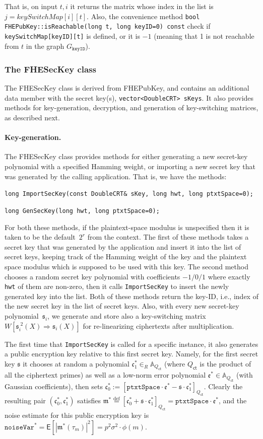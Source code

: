 \documentclass[14pt]{extarticle}
\newcommand{\A}{\mathbb{A}}
\def\Qct{Q_\mathsf{ct}}
\def\eqdef{\stackrel{\mathrm{def}}{=}}
\def\FHEPubKey{\textsf{FHEPubKey}}
\def\FHESecKey{\textsf{FHESecKey}}
\def\EXP{\mathsf{E}}
\newcommand{\ee}{\mathfrak{e}}
\newcommand{\ct}{\mathfrak{c}}
\newcommand{\mm}{\mathfrak{m}}
\newcommand{\sk}{\mathfrak{s}}
\begin{document}
\noindent
That is, on input $t,i$ it returns the matrix whose index in the
list is $j=keySwitchMap[i][t]$. Also, the convenience method
\texttt{bool FHEPubKey::isReachable(long t, long keyID=0) const}
check if \texttt{keySwitchMap[keyID][t]} is defined, or it is $-1$
(meaning that 1 is not reachable from $t$ in the graph
$G_{\mathtt{keyID}}$).

\subsubsection{The {\FHESecKey} class}\label{sec:FHESecKey}
The {\FHESecKey} class is derived from {\FHEPubKey}, and contains an
additional data member with the secret key(s), \texttt{vector<DoubleCRT>
sKeys}. It also provides methods for key-generation, decryption, and
generation of key-switching matrices, as described next.

\paragraph{Key-generation.}
The {\FHESecKey} class provides methods for either generating a
new secret-key polynomial with a specified Hamming weight, or
importing a new secret key that was generated by the calling
application. That is, we have the methods:

\texttt{long ImportSecKey(const DoubleCRT\& sKey, long hwt, long ptxtSpace=0);}

\texttt{long GenSecKey(long hwt, long ptxtSpace=0);}

For both these methods, if the plaintext-space modulus is unspecified
then it is taken to be the default~$2^r$ from the context.
The first of these methods takes a secret key that was generated by
the application and insert it into the list of secret keys, keeping
track of the Hamming weight of the key and the plaintext space modulus
which is supposed to be used with this key. The second method chooses
a random secret key polynomial with coefficients $-1/0/1$ where
exactly \texttt{hwt} of them are non-zero, then it calls 
\texttt{ImportSecKey} to insert the newly generated key into the list.
Both of these methods return the key-ID, i.e., index of the new secret
key in the list of secret keys. Also, with every new secret-key
polynomial~$\sk_i$, we generate and store also a key-switching matrix
$W[\sk_i^{\;2}(X)\Rightarrow\sk_i(X)]$ for re-linearizing ciphertexts
after multiplication.

The first time that \texttt{ImportSecKey} is called for a specific
instance, it also generates a public encryption key relative to this
first secret key. Namely, for the first secret key $\sk$ it chooses at
random a polynomial $\ct_1^*\in_R\A_{\Qct}$ (where $\Qct$ is the product
of all the ciphertext primes) as well as a low-norm error polynomial
$\ee^*\in\A_{\Qct}$ (with Gaussian coefficients), then sets $\ct_0^*:=
[\texttt{ptxtSpace}\cdot\ee^* - \sk\cdot\ct_1^*]_{\Qct}$. Clearly the
resulting pair $(\ct_0^*,\ct_1^*)$ satisfies $\mm^*\eqdef[\ct_0^*+
\sk\cdot\ct_1^*]_{\Qct}=\mathtt{ptxtSpace}\cdot\ee^*$, and the noise
estimate for this public encryption key is $\mathtt{noiseVar}^*=
\EXP[|\mm^*(\tau_m)|^2]=p^2\sigma^2\cdot\phi(m)$.
\end{document}
